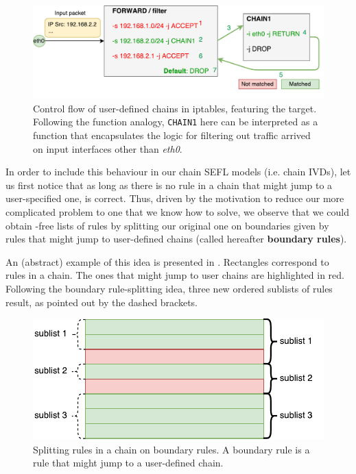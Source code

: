 \begin{figure}[h]
  \centering
  \captionsetup{justification=centering}
  \includegraphics[scale=0.6]{assets/img/iptables-user-chains}
  \caption[Control flow of user-defined chains in iptables.]{Control flow of
  user-defined chains in iptables, featuring the \RETURN target.  Following the
  function analogy, \texttt{CHAIN1} here can be interpreted as a function that
  encapsulates the logic for filtering out traffic arrived on input interfaces
  other than \emph{eth0}.}
  \label{fig:iptables-user-chains}
\end{figure}

In order to include this behaviour in our chain SEFL models (i.e. chain IVDs),
let us first notice that as long as there is no rule in a chain that might jump
to a user-specified one,  is
correct.  Thus, driven by the motivation to reduce our more complicated problem
to one that we know how to solve, we observe that we could obtain \RETURN-free
lists of rules by splitting our original one on boundaries given by rules that
might jump to user-defined chains (called hereafter \textbf{boundary rules}).

An (abstract) example of this idea is presented in
.  Rectangles correspond to rules in
a chain.  The ones that might jump to user chains are highlighted in red.
Following the boundary rule-splitting idea, three new ordered sublists of rules
result, as pointed out by the dashed brackets.

\begin{figure}[h]
  \centering
  \captionsetup{justification=centering}
  \includegraphics[scale=0.6]{assets/img/splitting-rules}
  \caption[Splitting rules in a chain on boundary rules.]{Splitting rules in a
  chain on boundary rules.  A boundary rule is a rule that might jump to a
  user-defined chain.}
  \label{fig:splitting-rules}
\end{figure}

